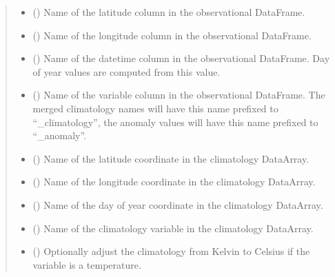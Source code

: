 \documentclass[letterpaper,10pt,english]{sphinxmanual}
\begin{document}
\begin{fulllineitems}
\begin{quote}
\begin{description}
\begin{itemize}
\item {}
\sphinxAtStartPar
{} () \textendash{} Name of the latitude column in the observational DataFrame.

\item {}
\sphinxAtStartPar
{} () \textendash{} Name of the longitude column in the observational DataFrame.

\item {}
\sphinxAtStartPar
{} () \textendash{} Name of the datetime column in the observational DataFrame. Day of year
values are computed from this value.

\item {}
\sphinxAtStartPar
{} () \textendash{} Name of the variable column in the observational DataFrame. The merged
climatology names will have this name prefixed to “\_climatology”, the
anomaly values will have this name prefixed to “\_anomaly”.

\item {}
\sphinxAtStartPar
{} () \textendash{} Name of the latitude coordinate in the climatology DataArray.

\item {}
\sphinxAtStartPar
{} () \textendash{} Name of the longitude coordinate in the climatology DataArray.

\item {}
\sphinxAtStartPar
{} () \textendash{} Name of the day of year coordinate in the climatology DataArray.

\item {}
\sphinxAtStartPar
{} () \textendash{} Name of the climatology variable in the climatology DataArray.

\item {}
\sphinxAtStartPar
{} () \textendash{} Optionally adjust the climatology from Kelvin to Celsius if the variable
is a temperature.


\end{itemize}
\end{description}
\end{quote}
\end{fulllineitems}
\end{document}
